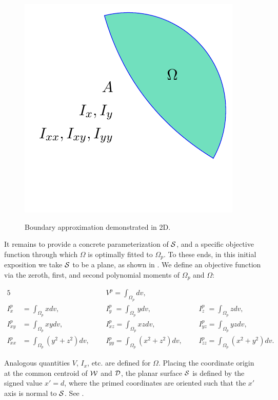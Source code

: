 \begin{linenomath}
\begin{figure}[ht!]
{		\includegraphics[scale=0.72]{media/imgs-073022/om/om-3.pdf}
		\label{fig:subfigure6}}
	
	\caption{Boundary approximation demonstrated in 2D.}
	\label{fig:figure3}
\end{figure}\end{linenomath}

It remains to provide a concrete parameterization of $\mathcal{S}$, and a specific objective function through which $\Omega$ is optimally fitted to $\Omega_p$.  To these ends, in this initial exposition we take $\mathcal{S}$ to be a plane, as shown in . We define an objective function via the zeroth, first, and second polynomial moments of $\Omega_p$ and $\Omega$: 
\begin{linenomath}\begin{alignat}{5}
&{} &&V^p = \int_{\Omega_p}dv, &&{} \\
I_{x\phantom{z}}^p &= \int_{\Omega_p}xdv, &&I_{y\phantom{z}}^p = \int_{\Omega_p}ydv, &&I_{z\phantom{z}}^p = \int_{\Omega_p}zdv, \\
I^p_{xy} &= \int_{\Omega_p}xydv, &&I^p_{xz} = \int_{\Omega_p}xzdv, &&I^p_{yz} = \int_{\Omega_p}yzdv, \\
I^p_{xx} &= \int_{\Omega_p}(y^2 + z^2)dv, \text{\ \ \ \ \ \ }&&I^p_{yy} = \int_{\Omega_p}(x^2 + z^2)dv, \text{\ \ \ \ \ \ }&&I^p_{zz} = \int_{\Omega_p}(x^2 + y^2)dv.
\end{alignat}\end{linenomath}
Analogous quantities $V$, $I_x$, etc. are defined for $\Omega$.  Placing the coordinate origin at the common centroid of $\mathcal{W}$ and $\mathcal{D}$, the planar surface $\mathcal{S}$ is defined by the signed value $x' = d$, where the primed coordinates are oriented such that the $x'$ axis is normal to $\mathcal{S}$.  See .

